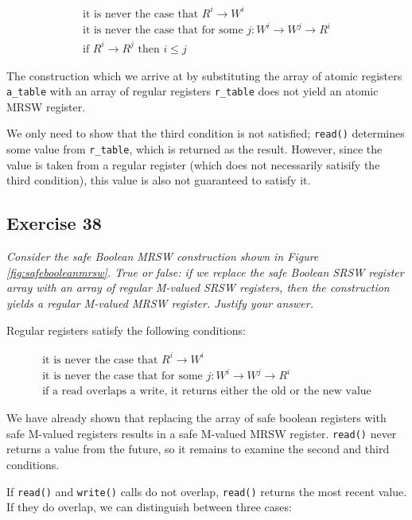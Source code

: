 \documentclass[a4paper,10pt]{article}
\begin{document}
\begin{gather}
\text{it is never the case that } R^i \rightarrow W^i \\
\text{it is never the case that for some } j: W^i \rightarrow W^j \rightarrow R^i \\
\text{if } R^i \rightarrow R^j \text{ then } i \leq j
\end{gather}

The construction which we arrive at by substituting the array of atomic registers 
\lstinline|a_table| with an array of regular registers \lstinline|r_table| does not
yield an atomic MRSW register.

We only need to show that the third condition is not satisfied; \lstinline|read()|
determines some value from \lstinline|r_table|, which is returned as the result.
However, since the value is taken from a regular register (which does not necessarily
satisify the third condition), this value is also not guaranteed to satisfy it.


\subsection{Exercise 38}

\emph{Consider the safe Boolean MRSW construction shown in Figure \ref{fig:safebooleanmrsw}.
True or false: if we replace the safe Boolean SRSW register array with an array
of regular M-valued SRSW registers, then the construction yields a regular
M-valued MRSW register. Justify your answer.}

\vspace{3mm}

Regular registers satisfy the following conditions:

\begin{gather}
\text{it is never the case that } R^i \rightarrow W^i \\
\text{it is never the case that for some } j: W^i \rightarrow W^j \rightarrow R^i \\
\text{if a read overlaps a write, it returns either the old or the new value}
\end{gather}

We have already shown that replacing the array of safe boolean registers with
safe M-valued registers results in a safe M-valued MRSW register. \lstinline|read()|
never returns a value from the future, so it remains to examine the second and third conditions.

If \lstinline|read()| and \lstinline|write()| calls do not overlap, \lstinline|read()|
returns the most recent value. If they do overlap, we can distinguish between three cases:
\end{document}
